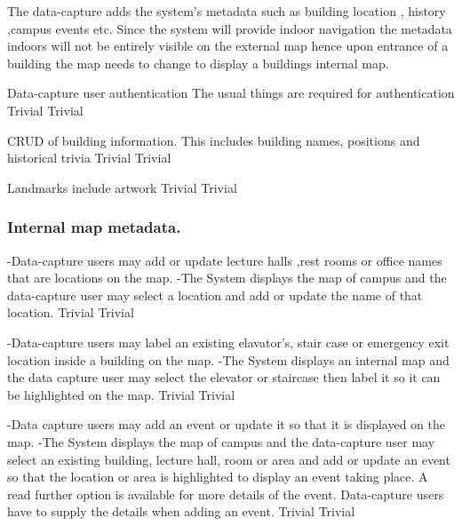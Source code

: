 The data-capture adds the system's metadata such as building location , history ,campus events etc. Since the system will provide indoor navigation the metadata indoors will not be entirely visible on the external map hence upon entrance of a building the map needs to change to display a buildings internal map.

\FuncReq
  {Data-capture user authentication}
  {The usual things are required for authentication}
  {Trivial}
  {Trivial}

{CRUD of building information. This includes building names, positions and historical trivia}
{Trivial}
{Trivial}

{Landmarks include artwork }
{Trivial}
{Trivial}

\subsubsection {Internal map metadata.}
{-Data-capture users may add or update lecture halls ,rest rooms or office names that are locations on the map.
	-The System displays the map of campus and the data-capture user may select a location and add or update the name of that location.}
{Trivial}
{Trivial}

{-Data-capture users may label an existing elavator's, stair case or emergency exit location inside a building on the map.
-The System displays an internal map and the data capture user may select the elevator or staircase then label it so it can be highlighted on the map.}
{Trivial}
{Trivial}
 
{-Data capture users may add an event or update it so that it is displayed on the map.
        -The System displays the map of campus and the data-capture user may select an existing building, lecture hall, room or area and add or update an event so that the location or area is highlighted to display an event taking place. A read further option is available for more details of the event. Data-capture users have to supply the details when adding an event.}
{Trivial}
{Trivial}
 
         
           
         
